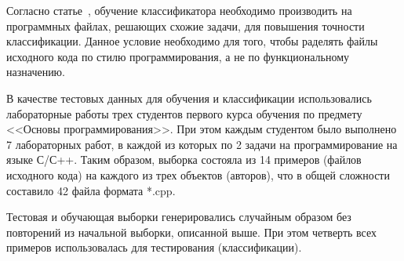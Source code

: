 Согласно статье~\cite{caliskan}, обучение классификатора необходимо производить на программных файлах, решающих схожие задачи, для повышения точности классификации. Данное условие необходимо для того, чтобы раделять файлы исходного кода по стилю программирования, а не по функциональному назначению.

В качестве тестовых данных для обучения и классификации использовались лабораторные работы трех студентов первого курса обучения по предмету <<Основы программирования>>. При этом каждым студентом было выполнено 7 лабораторных работ, в каждой из которых по 2 задачи на программирование на языке С/С++. Таким образом, выборка состояла из 14 примеров (файлов исходного кода) на каждого из трех объектов (авторов), что в общей сложности составило 42 файла формата *.cpp. 

Тестовая и обучающая выборки генерировались случайным образом без повторений из начальной выборки, описанной выше. При этом четверть всех примеров использовалась для тестирования (классификации). 
